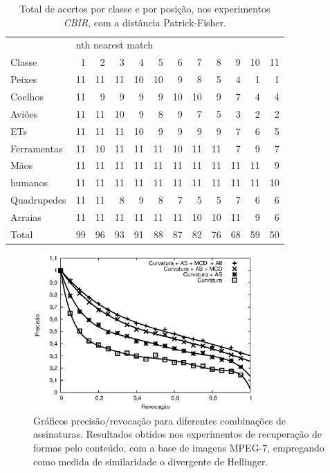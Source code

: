 \begin{table}
\centering
\caption{\label{tab:KimiaPatrick-Fisher} Total de acertos por classe e por posição, nos experimentos \emph{CBIR}, com a distância Patrick-Fisher.}
\begin{tabular}{l| r r r r r r r r r r r}
\hline
&\multicolumn{11}{l}{nth nearest match} \\
\cline{2-12}
Classe&1&2&3&4&5&6&7&8&9&10&11 \\
 \hline
Peixes&11&11&11&10&10&9&8&5&4&1&1\\
Coelhos&11&9&9&9&9&10&10&9&7&4&4\\ 
Aviões&11&11&10&9&8&9&7&5&3&2&2\\
ETs&11&11&11&10&9&9&9&9&7&6&5\\
Ferramentas&11&10&11&11&11&10&11&11&7&9  &7\\
Mãos&11&11&11&11&11&11&11&11&11&11&9\\
humanos&11&11&11&11&11&11&11&11&11&11&10\\
Quadrupedes&11&11&8&9&8&7&5&5&7&6&6\\
Arraias&11&11&11&11&11&11&10&10&11&9&6\\
\hline
Total&99&96&93&91&88&87&82&76&68&59&50\\
\hline
\end{tabular}
\end{table}


\begin{figure}[h!]
  \caption{\label{fig:graph1} Gráficos precisão/revocação para diferentes combinações de assinaturas. Resultados obtidos nos experimentos de recuperação de formas pelo conteúdo, com a base de imagens MPEG-7, empregando como medida de similaridade o divergente de Hellinger. }
  \centering
  \includegraphics[width=0.75\textwidth]{graph1.eps}
\end{figure}


